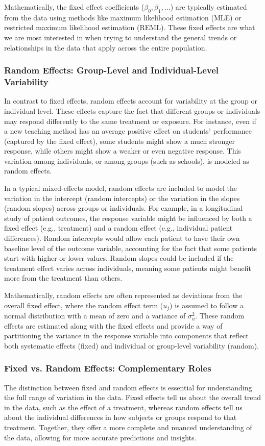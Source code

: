 Mathematically, the fixed effect coefficients ($\beta_0,\beta_1, \dots$) are typically estimated from the data using methods like maximum likelihood estimation (MLE) or restricted maximum likelihood estimation (REML). These fixed effects are what we are most interested in when trying to understand the general trends or relationships in the data that apply across the entire population.

\subsubsection*{Random Effects: Group-Level and Individual-Level Variability}
In contrast to fixed effects, random effects account for variability at the group or individual level. These effects capture the fact that different groups or individuals may respond differently to the same treatment or exposure. For instance, even if a new teaching method has an average positive effect on students' performance (captured by the fixed effect), some students might show a much stronger response, while others might show a weaker or even negative response. This variation among individuals, or among groups (such as schools), is modeled as random effects.

In a typical mixed-effects model, random effects are included to model the variation in the intercept (random intercepts) or the variation in the slopes (random slopes) across groups or individuals. For example, in a longitudinal study of patient outcomes, the response variable might be influenced by both a fixed effect (e.g., treatment) and a random effect (e.g., individual patient differences). Random intercepts would allow each patient to have their own baseline level of the outcome variable, accounting for the fact that some patients start with higher or lower values. Random slopes could be included if the treatment effect varies across individuals, meaning some patients might benefit more from the treatment than others.

Mathematically, random effects are often represented as deviations from the overall fixed effect, where the random effect term ($u_j$) is assumed to follow a normal distribution with a mean of zero and a variance of $\sigma_u^2$. These random effects are estimated along with the fixed effects and provide a way of partitioning the variance in the response variable into components that reflect both systematic effects (fixed) and individual or group-level variability (random).

\subsubsection*{Fixed vs. Random Effects: Complementary Roles}
The distinction between fixed and random effects is essential for understanding the full range of variation in the data. Fixed effects tell us about the overall trend in the data, such as the effect of a treatment, whereas random effects tell us about the individual differences in how subjects or groups respond to that treatment. Together, they offer a more complete and nuanced understanding of the data, allowing for more accurate predictions and insights.

